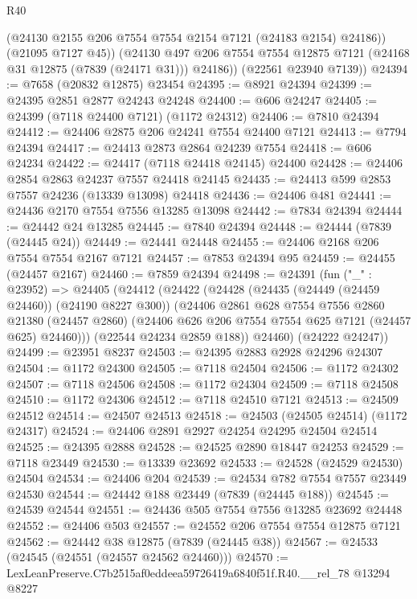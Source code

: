 \begin{lexlean}{R40}
\begin{coremodule}
            (@24130 @2155 @206 @7554 @7554 @2154 @7121 (@24183 @2154) @24186))
          (@21095 @7127 @45))
        (@24130 @497 @206 @7554 @7554 @12875 @7121 (@24168 @31 @12875 (@7839 (@24171 @31))) @24186))
      (@22561 @23940 @7139))
@24394 := @7658 (@20832 @12875) @23454
@24395 := @8921 @24394
@24399 := @24395 @2851 @2877 @24243 @24248
@24400 := @606 @24247
@24405 := @24399 (@7118 @24400 @7121) (@1172 @24312)
@24406 := @7810 @24394
@24412 := @24406 @2875 @206 @24241 @7554 @24400 @7121
@24413 := @7794 @24394
@24417 := @24413 @2873 @2864 @24239 @7554
@24418 := @606 @24234
@24422 := @24417 (@7118 @24418 @24145) @24400
@24428 := @24406 @2854 @2863 @24237 @7557 @24418 @24145
@24435 := @24413 @599 @2853 @7557 @24236 (@13339 @13098) @24418
@24436 := @24406 @481
@24441 := @24436 @2170 @7554 @7556 @13285 @13098
@24442 := @7834 @24394
@24444 := @24442 @24 @13285
@24445 := @7840 @24394
@24448 := @24444 (@7839 (@24445 @24))
@24449 := @24441 @24448
@24455 := @24406 @2168 @206 @7554 @7554 @2167 @7121
@24457 := @7853 @24394 @95
@24459 := @24455 (@24457 @2167)
@24460 := @7859 @24394
@24498 := @24391
    (fun ("_" : @23952) =>
    @24405
      (@24412
        (@24422
          (@24428
            (@24435 (@24449 (@24459 @24460)) (@24190 @8227 @300))
            (@24406
              @2861
              @628
              @7554
              @7556
              @2860
              @21380
              (@24457 @2860)
              (@24406 @626 @206 @7554 @7554 @625 @7121 (@24457 @625) @24460)))
          (@22544 @24234 @2859 @188))
        @24460)
      (@24222 @24247))
@24499 := @23951 @8237
@24503 := @24395 @2883 @2928 @24296 @24307
@24504 := @1172 @24300
@24505 := @7118 @24504
@24506 := @1172 @24302
@24507 := @7118 @24506
@24508 := @1172 @24304
@24509 := @7118 @24508
@24510 := @1172 @24306
@24512 := @7118 @24510 @7121
@24513 := @24509 @24512
@24514 := @24507 @24513
@24518 := @24503 (@24505 @24514) (@1172 @24317)
@24524 := @24406 @2891 @2927 @24254 @24295 @24504 @24514
@24525 := @24395 @2888
@24528 := @24525 @2890 @18447 @24253
@24529 := @7118 @23449
@24530 := @13339 @23692
@24533 := @24528 (@24529 @24530) @24504
@24534 := @24406 @204
@24539 := @24534 @782 @7554 @7557 @23449 @24530
@24544 := @24442 @188 @23449 (@7839 (@24445 @188))
@24545 := @24539 @24544
@24551 := @24436 @505 @7554 @7556 @13285 @23692 @24448
@24552 := @24406 @503
@24557 := @24552 @206 @7554 @7554 @12875 @7121
@24562 := @24442 @38 @12875 (@7839 (@24445 @38))
@24567 := @24533 (@24545 (@24551 (@24557 @24562 @24460)))
@24570 := LexLeanPreserve.C7b2515af0eddeea59726419a6840f51f.R40.__rel_78 @13294 @8227

\end{coremodule}
\end{lexlean}
